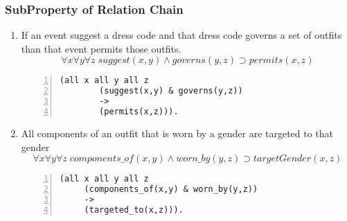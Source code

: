 \documentclass[paper=a4, fontsize=11pt]{scrartcl} %
\numberwithin{equation}{section} %
\numberwithin{figure}{section} %
\numberwithin{table}{section} %
\begin{document}
\subsubsection{SubProperty of Relation Chain}
\begin{enumerate}
	
	\item If an event suggest a dress code and that dress code governs a set of outfits than that event permits those outfits.
	\begin{equation*}
		\forall x \forall y \forall z \; suggest(x,y) \land governs(y,z) \supset permits(x,z)
	\end{equation*}
	\begin{Verbatim}[frame=lines,gobble=2,numbers=left]
		(all x all y all z 
		(suggest(x,y) & governs(y,z))
		->
		(permits(x,z))).
	\end{Verbatim}

	
	\item All components of an outfit that is worn by a gender are targeted to that gender 
	\begin{equation*}
		\forall x \forall y \forall z \; components\_of(x,y) \land worn\_by(y,z) \supset targetGender(x,z)
	\end{equation*}
	\begin{Verbatim}[frame=lines,gobble=2,numbers=left]
	 (all x all y all z 
	 (components_of(x,y) & worn_by(y,z))
	 ->
	 (targeted_to(x,z))). 
	\end{Verbatim}
	
	\end{enumerate}

\clearpage
\end{document}
